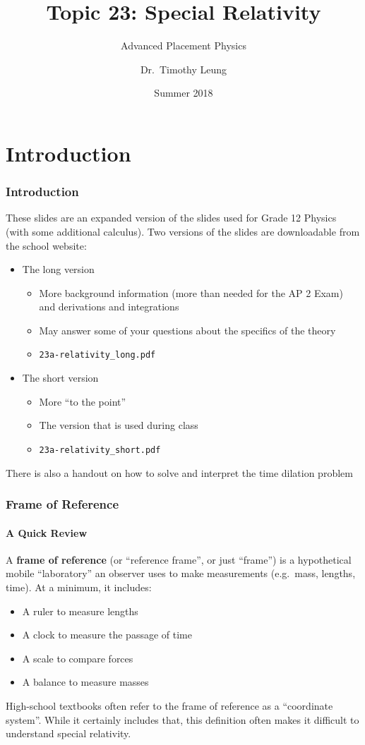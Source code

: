 \documentclass[12pt,compress,aspectratio=169]{beamer}
\title{Topic 23: Special Relativity}
\subtitle{Advanced Placement Physics}
\author[TML]{Dr.\ Timothy Leung}
\institute{Olympiads School}
\date{Summer 2018}
\begin{document}
\begin{frame}
  \maketitle
\end{frame}



\section[Intro]{Introduction}
\begin{frame}
  \frametitle{Introduction}
  These slides are an expanded version of the slides used for Grade 12 Physics
  (with some additional calculus). Two versions of the slides are downloadable
  from the school website:
  \begin{itemize}
  \item The long version
    \begin{itemize}
    \item More background information (more than needed for the AP 2 Exam) and
      derivations and integrations
    \item May answer some of your questions about the specifics of the theory
    \item \texttt{23a-relativity\_long.pdf}
    \end{itemize}
  \item The short version
    \begin{itemize}
    \item More ``to the point''
    \item The version that is used during class
    \item \texttt{23a-relativity\_short.pdf}
    \end{itemize}
  \end{itemize}
  There is also a handout on how to solve and interpret the time dilation
  problem
\end{frame}


\begin{frame}
  \frametitle{Frame of Reference}
  \framesubtitle{A Quick Review}
  A \textbf{frame of reference} (or ``reference frame'', or just ``frame'') is
  a hypothetical mobile ``laboratory'' an observer uses to make measurements
  (e.g.\ mass, lengths, time). At a minimum, it includes:
  \begin{itemize}
  \item A ruler to measure lengths
  \item A clock to measure the passage of time
  \item A scale to compare forces
  \item A balance to measure masses
  \end{itemize}
  \vspace{.15in}\textcolor{red!85}{High-school textbooks often refer to the
    frame of reference as a ``coordinate system''. While it certainly includes
    that, this definition often makes it difficult to understand special
    relativity.}
\end{frame}
\end{document}
